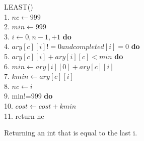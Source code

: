 \documentclass{article}
\begin{document}
    \begin{figure}
\begin{center}
\begin{tabbing}
{LEAST}() \\
1. \indent              $nc \leftarrow 999$   \\
2. $min \leftarrow 999$ \\
3.  $i \leftarrow 0, n-1, +1 $
{\bf  do}\\
4.     $ary[c][i]!=0 and completed[i]=0$
{\bf  do}\\
5.       $ary[c][i]+ary[i][c] < min$
{\bf  do}\\
6.  \indent  $min \leftarrow ary[i][0]+ary[c][i]$ \\
7.        \indent      $kmin \leftarrow ary[c][i]$ \\
8.        \indent      $nc \leftarrow i$ \\
9.        min!=999
{\bf  do}\\
10.       \indent $cost \leftarrow cost + kmin$ \\
11. \indent return nc \\
\end{tabbing}
\caption{Returning an int that is equal to the last i.}


\end{center}
\end{figure}
\end{document}
